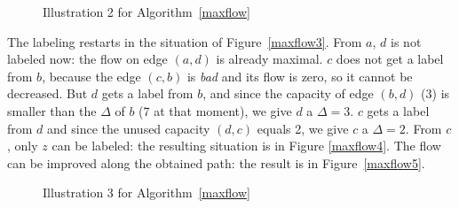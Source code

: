 \begin{figure}[ht]
\begin{center}
\hspace{1cm} 
\end{center}
\caption{Illustration 2 for Algorithm~\ref{maxflow}}
\end{figure}

The labeling restarts in the situation of Figure~\ref{maxflow3}. From
$a$, $d$ is not labeled now: the flow on edge $(a,d)$ is already
maximal. $c$ does not get a label from $b$, because the edge $(c,b)$
is {\em bad} and its flow is zero, so it cannot be decreased. But $d$
gets a label from $b$, and since the capacity of edge $(b,d)$ (3)
is smaller than the $\Delta$ of $b$ (7 at that moment), we give $d$ a
$\Delta = 3$. $c$ gets a label from $d$ and since the unused capacity
$(d,c)$ equals 2, we give $c$ a $\Delta = 2$. From $c$, only $z$ can be
labeled: the resulting situation is in Figure \ref{maxflow4}. The flow
can be improved along the obtained path: the result is in
Figure~\ref{maxflow5}.

\begin{figure}[ht]
\begin{center}
 \hspace{1cm}
\end{center}
\caption{Illustration 3 for Algorithm~\ref{maxflow}}
\end{figure}

